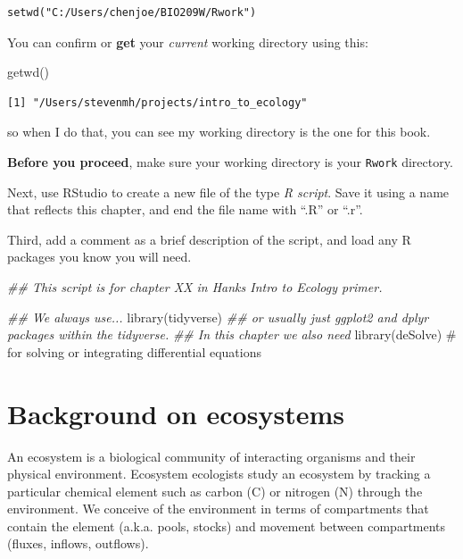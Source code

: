 \documentclass[
  letterpaper,
  DIV=11,
  numbers=noendperiod]{scrreprt}
\newenvironment{Shaded}{\begin{snugshade}}{\end{snugshade}}
\newcommand{\CommentTok}[1]{\textcolor[rgb]{0.37,0.37,0.37}{#1}}
\newcommand{\DocumentationTok}[1]{\textcolor[rgb]{0.37,0.37,0.37}{\textit{#1}}}
\newcommand{\FunctionTok}[1]{\textcolor[rgb]{0.28,0.35,0.67}{#1}}
\newcommand{\NormalTok}[1]{\textcolor[rgb]{0.00,0.23,0.31}{#1}}
\begin{document}
\begin{verbatim}
setwd("C:/Users/chenjoe/BIO209W/Rwork")
\end{verbatim}

You can confirm or \textbf{get} your \emph{current} working directory
using this:

\begin{Shaded}
\begin{Highlighting}[]
\FunctionTok{getwd}\NormalTok{()}
\end{Highlighting}
\end{Shaded}

\begin{verbatim}
[1] "/Users/stevenmh/projects/intro_to_ecology"
\end{verbatim}

so when I do that, you can see my working directory is the one for this
book.

\textbf{Before you proceed}, make sure your working directory is your
\texttt{Rwork} directory.

Next, use RStudio to create a new file of the type \emph{R script}. Save
it using a name that reflects this chapter, and end the file name with
``.R'' or ``.r''.

Third, add a comment as a brief description of the script, and load any
R packages you know you will need.

\begin{Shaded}
\begin{Highlighting}[]
\DocumentationTok{\#\# This script is for chapter XX in Hank\textquotesingle{}s Intro to Ecology primer.}

\DocumentationTok{\#\# We always use...}
\FunctionTok{library}\NormalTok{(tidyverse)}
\DocumentationTok{\#\# or usually just ggplot2 and dplyr packages within the tidyverse.}
\DocumentationTok{\#\# In this chapter we also need}
\FunctionTok{library}\NormalTok{(deSolve)}
\CommentTok{\# for solving or integrating differential equations}
\end{Highlighting}
\end{Shaded}

\section{Background on ecosystems}\label{background-on-ecosystems}

An ecosystem is a biological community of interacting organisms and
their physical environment. Ecosystem ecologists study an ecosystem by
tracking a particular chemical element such as carbon (C) or nitrogen
(N) through the environment. We conceive of the environment in terms of
compartments that contain the element (a.k.a. pools, stocks) and
movement between compartments (fluxes, inflows, outflows).
\end{document}
